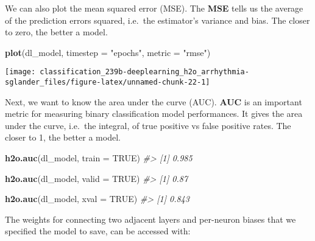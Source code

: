 \documentclass[]{book}
\newenvironment{Shaded}{\begin{snugshade}}{\end{snugshade}}
\newcommand{\CommentTok}[1]{\textcolor[rgb]{0.56,0.35,0.01}{\textit{#1}}}
\newcommand{\DataTypeTok}[1]{\textcolor[rgb]{0.13,0.29,0.53}{#1}}
\newcommand{\KeywordTok}[1]{\textcolor[rgb]{0.13,0.29,0.53}{\textbf{#1}}}
\newcommand{\NormalTok}[1]{#1}
\newcommand{\OtherTok}[1]{\textcolor[rgb]{0.56,0.35,0.01}{#1}}
\newcommand{\StringTok}[1]{\textcolor[rgb]{0.31,0.60,0.02}{#1}}
\begin{document}
We can also plot the mean squared error (MSE). The \textbf{MSE} tells us the average of the prediction errors squared, i.e.~the estimator's variance and bias. The closer to zero, the better a model.

\begin{Shaded}
\begin{Highlighting}[]
\KeywordTok{plot}\NormalTok{(dl_model,}
     \DataTypeTok{timestep =} \StringTok{"epochs"}\NormalTok{,}
     \DataTypeTok{metric =} \StringTok{"rmse"}\NormalTok{)}
\end{Highlighting}
\end{Shaded}

\begin{center}\texttt{[image: classification\_239b-deeplearning\_h2o\_arrhythmia-sglander\_files/figure-latex/unnamed-chunk-22-1]} \end{center}

Next, we want to know the area under the curve (AUC). \textbf{AUC} is an important metric for measuring binary classification model performances. It gives the area under the curve, i.e.~the integral, of true positive vs false positive rates. The closer to 1, the better a model.

\begin{Shaded}
\begin{Highlighting}[]
\KeywordTok{h2o.auc}\NormalTok{(dl_model, }\DataTypeTok{train =} \OtherTok{TRUE}\NormalTok{)}
\CommentTok{#> [1] 0.985}
\end{Highlighting}
\end{Shaded}

\begin{Shaded}
\begin{Highlighting}[]
\KeywordTok{h2o.auc}\NormalTok{(dl_model, }\DataTypeTok{valid =} \OtherTok{TRUE}\NormalTok{)}
\CommentTok{#> [1] 0.87}
\end{Highlighting}
\end{Shaded}

\begin{Shaded}
\begin{Highlighting}[]
\KeywordTok{h2o.auc}\NormalTok{(dl_model, }\DataTypeTok{xval =} \OtherTok{TRUE}\NormalTok{)}
\CommentTok{#> [1] 0.843}
\end{Highlighting}
\end{Shaded}

The weights for connecting two adjacent layers and per-neuron biases that we specified the model to save, can be accessed with:
\end{document}
